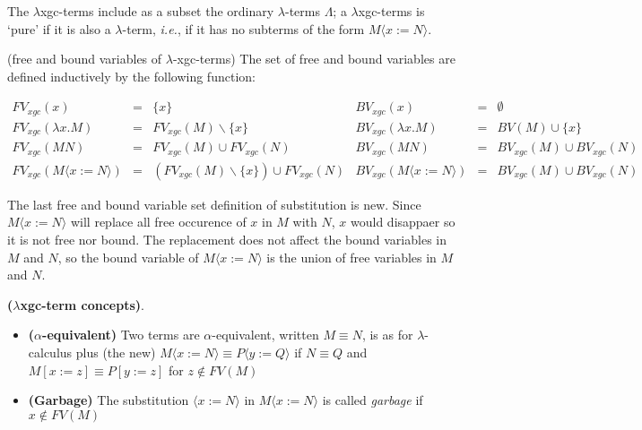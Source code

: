 The $\lambda$xgc-terms include as a subset the ordinary $\lambda$-terms $\Lambda$; a $\lambda$xgc-terms is `pure' if it is also a $\lambda$-term, \textit{i.e.}, if it has no subterms of the form $M\langle x:=N\rangle$.

\begin{def1}
\normalfont (free and bound variables of $\lambda$-xgc-terms) The set of free and bound variables are defined inductively by the following function:
\end{def1}
\begin{equation*}\label{eq:fvxgc}
\begin{array}{lcllcl}
FV_{xgc}(x)           & = & \{x\}             & BV_{xgc}(x)           &=& \emptyset\\
FV_{xgc}(\lambda x.M) & = & FV_{xgc}(M)\backslash \{x\} & BV_{xgc}(\lambda x.M) &=& BV(M)\cup \{x\}\\
FV_{xgc}(MN)          & = & FV_{xgc}(M)\cup FV_{xgc}(N) & BV_{xgc}(MN)          &=& BV_{xgc}(M)\cup BV_{xgc}(N)\\
FV_{xgc}(M\langle x:=N\rangle)          & = & (FV_{xgc}(M)\backslash \{x\})\cup FV_{xgc}(N) & BV_{xgc}(M\langle x:=N\rangle)    &=& BV_{xgc}(M)\cup BV_{xgc}(N)
\end{array}
\end{equation*}

The last free and bound variable set definition of substitution is new. Since $M\langle x:=N\rangle$ will replace all free occurence of $x$ in $M$ with $N$, $x$ would disappaer so it is not free nor bound. The replacement does not affect the bound variables in $M$ and $N$, so the bound variable of $M\langle x:=N\rangle$ is the union of free variables in $M$ and $N$.

\begin{def1}
\normalfont \textbf{($\lambda$xgc-term concepts)}. 
\end{def1}

\begin{itemize}
\item \textbf{($\alpha$-equivalent)} Two terms are $\alpha$-equivalent, written $M\equiv N$, is as for $\lambda$-calculus plus (the new) $M\langle x:=N\rangle \equiv P\langle y:=Q\rangle$ if $N \equiv Q$ and $M[x:=z]\equiv P[y:=z]$ for $z \notin FV(M)$
\item \textbf{(Garbage)} The substitution $\langle x:=N\rangle$ in $M\langle x:=N\rangle$ is called \textit{garbage} if $x \notin FV(M)$
\end{itemize}



